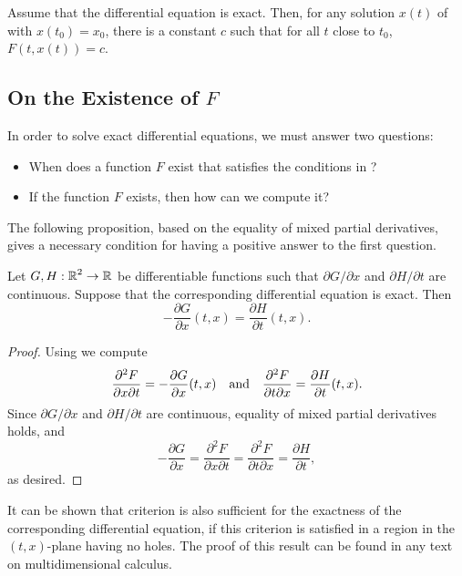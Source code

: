 \documentclass{ximera}
\begin{document}
\begin{thm} \label{thm:exact}
Assume that the differential equation  is exact.  Then, for any 
solution $x(t)$ of  with $x(t_0)=x_0$, there is a constant $c$ 
such that for all $t$ close to $t_0$, $F(t,x(t)) = c$.
\end{thm}

\subsection*{On the Existence of $F$}

In order to solve exact differential equations,
 we must answer two 
questions: 
\begin{itemize}
\item When does a function $F$ exist that satisfies the 
conditions in ?
\item If the function $F$ exists, then how can we compute it?
\end{itemize}
The following proposition, based on the equality of mixed partial derivatives, 
gives a necessary condition for having a positive answer to the first question.

\begin{prop} \label{prop:exact}
Let $G,H:\mbox{$\Bbb{R}$}^2\to\mbox{$\Bbb{R}$}$ be differentiable functions such that
$\partial G/\partial x$ and $\partial H/\partial t$ are
continuous.  Suppose that the corresponding differential
equation  is exact.  Then
\begin{equation} \label{eq:Gy=Hs}
-\frac{\partial G}{\partial x} (t,x) = \frac{\partial H}{\partial
t} (t,x).
\end{equation}
\end{prop}

\begin{proof} Using  we compute
\[
\frac{\partial^2 F}{\partial x\partial t} = 
-\frac{\partial G}{\partial x} (t,x) \quad\mbox{and}\quad 
\frac{\partial^2 F}{\partial t\partial x} = 
\frac{\partial H}{\partial t} (t,x).
\]
Since $\partial G/\partial x$ and $\partial H/\partial t$ are
continuous, equality of mixed partial derivatives holds, and
\[
-\frac{\partial G}{\partial x} = 
\frac{\partial^2 F}{\partial x\partial t} =
\frac{\partial^2 F}{\partial t\partial x} =
\frac{\partial H}{\partial t},
\]
as desired. \end{proof}

\begin{rmk} \label{rmk:exact}
{\rm It can be shown that criterion  is also
sufficient for the exactness of the corresponding differential
equation, if this criterion is satisfied in a region in the
$(t,x)$-plane having no holes. The proof of this result can be
found in any text on multidimensional calculus.}
\end{rmk}
\end{document}

